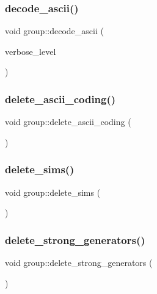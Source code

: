 \subsubsection{\texorpdfstring{decode\+\_\+ascii()}{decode\_ascii()}}
{\footnotesize\ttfamily void group\+::decode\+\_\+ascii (\begin{DoxyParamCaption}\item[{\mbox{\hyperlink{galois_8h_a09fddde158a3a20bd2dcadb609de11dc}{I\+NT}}}]{verbose\+\_\+level }\end{DoxyParamCaption})}

\mbox{\label{classgroup_aa71c4507467519fc564a6715fe7efdf5}} 
\subsubsection{\texorpdfstring{delete\+\_\+ascii\+\_\+coding()}{delete\_ascii\_coding()}}
{\footnotesize\ttfamily void group\+::delete\+\_\+ascii\+\_\+coding (\begin{DoxyParamCaption}{ }\end{DoxyParamCaption})}

\mbox{\label{classgroup_accebe64da3d51160a974fad069a90eac}} 
\subsubsection{\texorpdfstring{delete\+\_\+sims()}{delete\_sims()}}
{\footnotesize\ttfamily void group\+::delete\+\_\+sims (\begin{DoxyParamCaption}{ }\end{DoxyParamCaption})}

\mbox{\label{classgroup_a36c96bdf4428fdf236dfabab0f82b898}} 
\subsubsection{\texorpdfstring{delete\+\_\+strong\+\_\+generators()}{delete\_strong\_generators()}}
{\footnotesize\ttfamily void group\+::delete\+\_\+strong\+\_\+generators (\begin{DoxyParamCaption}{ }\end{DoxyParamCaption})}

